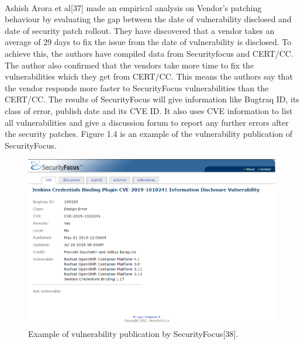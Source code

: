 \paragraph{}
Ashish Arora et al[37] made an empirical analysis on Vendor’s patching behaviour by evaluating the gap between the date of vulnerability disclosed and date of security patch rollout. They have discovered that a vendor takes an average of 29 days to fix the issue from the date of vulnerability is disclosed. To achieve this, the authors have compiled data from Securityfocus and CERT/CC. The author also confirmed that the vendors take more time to fix the vulnerabilities which they get from CERT/CC. This means the authors say that the vendor responds more faster to SecurityFocus vulnerabilities than the CERT/CC. The results of SecurityFocus will give information like Bugtraq ID, its class of error, publish date and its CVE ID. It also uses CVE information to list all vulnerabilities and give a discussion forum to report any further errors after the security patches. Figure 1.4 is an example of the vulnerability publication of SecurityFocus.
\newpage
\begin{figure}[h!]
	\includegraphics[width=15cm]{includes/securityFocus.png}
	\centering
	\caption{Example of vulnerability publication by SecurityFocus[38].}
	\label{fig:securityFocus}
\end{figure}

